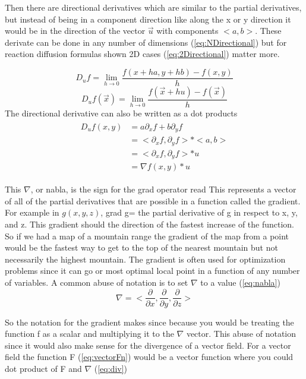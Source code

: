 \documentclass[12pt, letterpaper]{article}
\begin{document}
\newpage{}
Then there are directional derivatives which are similar to the partial derivatives, but instead of being in a component direction like along the x  or y direction it would be in the direction of the vector $\vec{u}$
with components $ <a, b> $. These derivate can be done in any number of dimensions (\ref{eq:NDirectional})
but for reaction diffusion formulas shown 2D cases (\ref{eq:2Directional}) matter more.

\begin{equation}
  D_u f = \lim_{h \to 0} \frac{f(x + ha, y+ hb) − f(x, y)}{h}
  \label{eq:2Directional}
\end{equation}
\begin{equation}
  D_u{f(\vec{x})} = \lim_{h \to 0} \frac{f(\vec{x} + hu) − f(\vec{x})}{h}
  \label{eq:NDirectional}
\end{equation}
The directional derivative can also be written as a dot products
\begin{gather*}
\begin{aligned}
  D_u f(x,y) &= a\partial_x f + b\partial_y f \\
             &= <\partial_x f, \partial_y f> * <a, b> \\
             &= <\partial_x f, \partial_y f> * u \\
             &= \nabla f(x,y) * u 
\end{aligned}
\end{gather*}

This $\nabla$, or nabla, is the sign for the grad operator read  This represents a vector of all
of the partial derivatives that are possible in a function called the gradient. For example in $g(x, y, z)$,
grad g= the partial derivative of g in respect to x, y, and z. This gradient should the direction of the
fastest increase of the function. So if we had a map of a mountain range the gradient of the map from a
point would be the fastest way to get to the top of the nearest mountain but not necessarily the highest
mountain. The gradient is often used for optimization problems since it can go  or most
optimal local  point in a function of any number of variables. A common abuse of notation is to set $\nabla$
to a value (\ref{eq:nabla})
\begin{equation}
  \nabla = <\frac{\partial}{\partial x}, \frac{\partial}{\partial y}, \frac{\partial}{\partial z}>
  \label{eq:nabla}
\end{equation}

So the notation for the gradient makes since because you would be treating the function f as a scalar and
multiplying it to the $\nabla$ vector. This abuse of notation since it would also make sense for the
divergence of a vector field. For a vector field the function F (\ref{eq:vectorFn}) would be a vector function
where you could dot product of F and $\nabla$ (\ref{eq:div})
\end{document}
